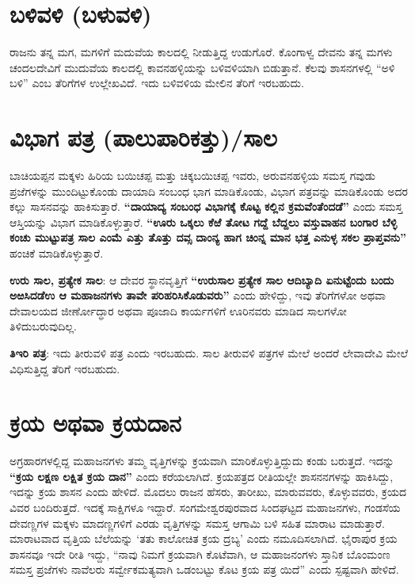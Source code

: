 \section{ಬಳಿವಳಿ (ಬಳುವಳಿ)}

ರಾಜನು ತನ್ನ ಮಗ, ಮಗಳಿಗೆ ಮದುವೆಯ ಕಾಲದಲ್ಲಿ ನೀಡುತ್ತಿದ್ದ ಉಡುಗೊರೆ. ಕೊಂಗಾಳ್ವ ದೇವನು ತನ್ನ ಮಗಳು ಚಂದಲದೇವಿಗೆ ಮುದುವೆಯ ಕಾಲದಲ್ಲಿ ಕಾವನಹಳ್ಳಿಯನ್ನು ಬಳಿವಳಿಯಾಗಿ ಬಿಡುತ್ತಾನೆ. ಕೆಲವು ಶಾಸನಗಳಲ್ಲಿ “ಅಳಿ ಬಳಿ” ಎಂಬ ತೆರಿಗೆಗಳ ಉಲ್ಲೇಖವಿದೆ. ಇದು ಬಳಿವಳಿಯ ಮೇಲಿನ ತೆರಿಗೆ ಇರಬಹುದು.


\section{ವಿಭಾಗ ಪತ್ರ (ಪಾಲುಪಾರಿಕತ್ತು)/ಸಾಲ}

ಬಾಚಿಯಪ್ಪನ ಮಕ್ಕಳು ಹಿರಿಯ ಬಯಿಚಪ್ಪ ಮತ್ತು ಚಿಕ್ಕಬಯಿಚಪ್ಪ ಇವರು, ಅರುವನಹಳ್ಳಿಯ ಸಮಸ್ತ ಗವುಡು ಪ್ರಜೆಗಳನ್ನು ಮುಂದಿಟ್ಟುಕೊಂಡು ದಾಯಾದಿ ಸಂಬಂಧ ಭಾಗ ಮಾಡಿಕೊಂಡು, ವಿಭಾಗ ಪತ್ರವನ್ನು ಮಾಡಿಕೊಂಡು ಅದರ ಕಲ್ಲು ಸಾಸನವನ್ನು ಹಾಕಿಸುತ್ತಾರೆ. \textbf{“ದಾಯಾದ್ಯ ಸಂಬಂಧ ವಿಭಾಗಕ್ಕೆ ಕೊಟ್ಟ ಕಲ್ಲಿನ ಕ್ರಮವೆಂತೆಂದಡೆ”} ಎಂದು ಸಮಸ್ತ ಆಸ್ತಿಯನ್ನು ವಿಭಾಗ ಮಾಡಿಕೊಳ್ಳುತ್ತಾರೆ. \textbf{“ಊರು ಒಕ್ಕಲು ಕೆಱೆ ತೋಟ ಗದ್ದೆ ಬೆದ್ದಲು ವಸ್ತುವಾಹನ ಬಂಗಾರ ಬೆಳ್ಳಿ ಕಂಚು ಮುಟ್ಟುಪತ್ರ ಸಾಲ ಎಂಮೆ ಎತ್ತು ತೊತ್ತು ದವ್ಸ ದಾಂನ್ಯ ಹಾಗ ಚಿಂನ್ನ ಮಾನ ಭತ್ತ ಎನುಳ್ಳ ಸಕಲ ಪ್ರಾಪ್ತವನು”} ಹಂಚಿಕೆ ಮಾಡಿಕೊಳ್ಳುತ್ತಾರೆ.

\textbf{ಉರು ಸಾಲ, ಪ್ರತ್ಯೇಕ ಸಾಲ}: ಆ ದೇವರ ಸ್ಥಾನವೃತ್ತಿಗೆ \textbf{“ಉರುಸಾಲ ಪ್ರತ್ಯೇಕ ಸಾಲ ಆದಿಬ್ಯಾದಿ ಏನುಟ್ಟೆಂದು ಬಂದು ಅಱಸಿದಡೆಉ ಆ ಮಹಾಜನಗಳು ತಾವೇ ಪರಿಹರಿಸಿಕೊಡುವರು” }ಎಂದು ಹೇಳಿದ್ದು, ಇವು ತೆರಿಗೆಗಳೋ ಅಥವಾ ದೇವಾಲಯದ ಜೀರ್ಣೋದ್ಧಾರ ಅಥವಾ ಪೂಜಾದಿ ಕಾರ್ಯಗಳಿಗೆ ಊರಿನವರು ಮಾಡಿದ ಸಾಲಗಳೋ ತಿಳಿದುಬರುವುದಿಲ್ಲ.

\textbf{ತಿಇರಿ ಪತ್ರ}: ಇದು ತೀರುವಳಿ ಪತ್ರ ಎಂದು ಇರಬಹುದು. ಸಾಲ ತೀರುವಳಿ ಪತ್ರಗಳ ಮೇಲೆ ಅಂದರೆ ಲೇವಾದೇವಿ ಮೇಲೆ ವಿಧಿಸುತ್ತಿದ್ದ ತೆರಿಗೆ ಇರಬಹುದು.


\section{ಕ್ರಯ ಅಥವಾ ಕ್ರಯದಾನ}

ಅಗ್ರಹಾರಗಳಲ್ಲಿದ್ದ ಮಹಾಜನಗಳು ತಮ್ಮ ವೃತ್ತಿಗಳನ್ನು ಕ್ರಯವಾಗಿ ಮಾರಿಕೊಳ್ಳುತ್ತಿದ್ದುದು ಕಂಡು ಬರುತ್ತದೆ. ಇದನ್ನು\textbf{ “ಕ್ರಯ ಲಕ್ಷಣ ಲಕ್ಷಿತ ಕ್ರಯ ದಾನ” }ಎಂದು ಕರೆಯಲಾಗಿದೆ. ಕ್ರಯಪತ್ರದ ರೀತಿಯಲ್ಲೇ ಶಾಸನನಗಳನ್ನು ಹಾಕಿಸಿದ್ದು, ಇದನ್ನು ಕ್ರಯ ಶಾಸನ ಎಂದು ಹೇಳಿದೆ. ಮೊದಲು ರಾಜನ ಹೆಸರು, ತಾರೀಖು, ಮಾರುವವರು, ಕೊಳ್ಳುವವರು, ಕ್ರಯದ ವಿವರ ಬಂದಿರುತ್ತದೆ. ಇದಕ್ಕೆ ಸಾಕ್ಷಿಗಳೂ ಇದ್ದಾರೆ. ಸಂಗಮೇಶ್ವರಪುರವಾದ ಸಿಂದಘಟ್ಟದ ಮಹಾಜನಗಳು, ಗಂಡಸೆಯ ದೇವಣ್ಣಗಳ ಮಕ್ಕಳು ಮಾದಣ್ಣಗಳಿಗೆ ಎರಡು ವೃತ್ತಿಗಳನ್ನು ಸಮಸ್ತ ಆಗಾಮಿ ಬಳಿ ಸಹಿತ ಮಾರಾಟ ಮಾಡುತ್ತಾರೆ. ಮಾರಾಟವಾದ ವೃತ್ತಿಯ ಬೆಲೆಯನ್ನು ‘ತತು ಕಾಲೋಚಿತ ಕ್ರಯ ದ್ರಬ್ಯ’ ಎಂದು ನಮೂದಿಸಲಾಗಿದೆ. ಭೈರಾಪುರ ಕ್ರಯ ಶಾಸನವೂ ಇದೇ ರೀತಿ ಇದ್ದು, “ನಾವು ನಿಮಗೆ ಕ್ರಯವಾಗಿ ಕೊಟೆವಾಗಿ, ಆ ಮಹಾಜನಂಗಳು ಸ್ತಾನಿಕ ಬೊಂಮಂಣ ಸಮಸ್ತ ಪ್ರಜೆಗಳು ನಾವೆಲರು ಸರ್ವ್ವೇಕಮತ್ಯವಾಗಿ ಒಡಂಬಟ್ಟು ಕೊಟ ಕ್ರಯ ಪತ್ರ ಯಿದೆ” ಎಂದು ಸ್ಪಷ್ಟವಾಗಿ ಹೇಳಿದೆ.


